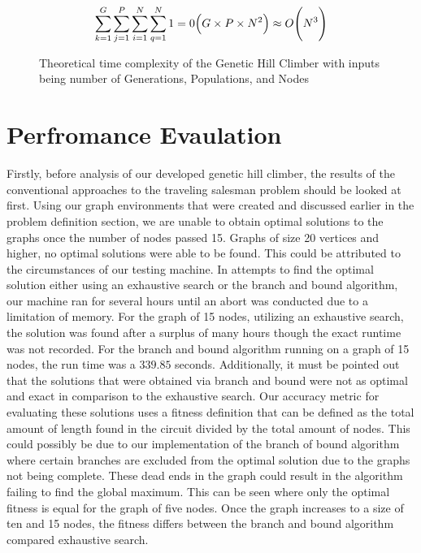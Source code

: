 \documentclass[sigplan,screen]{acmart}
\begin{document}
\begin{figure}
    \[ \sum_{k=1}^{G}\sum_{j=1}^{P}\sum_{i=1}^{N}\sum_{q=1}^{N}1 = 0\Big(G\times P
        \times N\textsuperscript{2}\Big) \approx O\Bigg(N\textsuperscript{3}\Bigg)
    \]
    \caption{Theoretical time complexity of the Genetic Hill Climber with inputs being number of Generations, Populations, and Nodes}
\end{figure}

\section{Perfromance Evaulation}
Firstly, before analysis of our developed genetic hill climber, the results of
the conventional approaches to the traveling salesman problem should be looked
at first. Using our graph environments that were created and discussed earlier
in the problem definition section, we are unable to obtain optimal solutions to
the graphs once the number of nodes passed 15. Graphs of size 20 vertices and
higher, no optimal solutions were able to be found. This could be attributed to
the circumstances of our testing machine. In attempts to find the optimal
solution either using an exhaustive search or the branch and bound algorithm,
our machine ran for several hours until an abort was conducted due to a
limitation of memory. For the graph of 15 nodes, utilizing an exhaustive search,
the solution was found after a surplus of many hours though the exact runtime
was not recorded. For the branch and bound algorithm running on a graph of 15
nodes, the run time was a $339.85$ seconds. Additionally, it must be pointed out
that the solutions that were obtained via branch and bound were not as optimal
and exact in comparison to the exhaustive search. Our accuracy metric for
evaluating these solutions uses a fitness definition that can be defined as the
total amount of length found in the circuit divided by the total amount of
nodes. This could possibly be due to our implementation of the branch of bound
algorithm where certain branches are excluded from the optimal solution due to
the graphs not being complete. These dead ends in the graph could result in the
algorithm failing to find the global maximum. This can be seen where only the
optimal fitness is equal for the graph of five nodes. Once the graph increases
to a size of ten and 15 nodes, the fitness differs between the branch and bound
algorithm compared exhaustive search.
\end{document}
